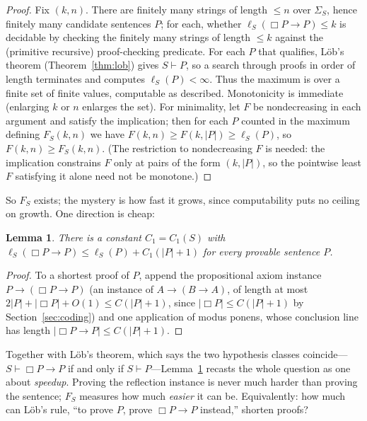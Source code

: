 \documentclass[11pt]{amsart}
\theoremstyle{plain}
\newtheorem{lemma}[theorem]{Lemma}
\theoremstyle{definition}
\begin{document}
\begin{proof}
Fix $(k,n)$. There are finitely many strings of length $\le n$ over $\Sigma_S$, hence finitely many candidate sentences $P$; for each, whether $\ell_S(\Box P \to P) \le k$ is decidable by checking the finitely many strings of length $\le k$ against the (primitive recursive) proof-checking predicate. For each $P$ that qualifies, L\"ob's theorem (Theorem~\ref{thm:lob}) gives $S \vdash P$, so a search through proofs in order of length terminates and computes $\ell_S(P) < \infty$. Thus the maximum is over a finite set of finite values, computable as described. Monotonicity is immediate (enlarging $k$ or $n$ enlarges the set). For minimality, let $F$ be nondecreasing in each argument and satisfy the implication; then for each $P$ counted in the maximum defining $F_S(k,n)$ we have $F(k,n) \ge F(k,|P|) \ge \ell_S(P)$, so $F(k,n) \ge F_S(k,n)$. (The restriction to nondecreasing $F$ is needed: the implication constrains $F$ only at pairs of the form $(k,|P|)$, so the pointwise least $F$ satisfying it alone need not be monotone.)
\end{proof}

So $F_S$ exists; the mystery is how fast it grows, since computability puts no ceiling on growth. One direction is cheap:

\begin{lemma}
\label{lem:cheap}
There is a constant $C_1 = C_1(S)$ with $\ell_S(\Box P \to P) \le \ell_S(P) + C_1(|P|+1)$ for every provable sentence $P$.
\end{lemma}

\begin{proof}
To a shortest proof of $P$, append the propositional axiom instance $P \to (\Box P \to P)$ (an instance of $A \to (B \to A)$, of length at most $2|P| + |\Box P| + O(1) \le C(|P|+1)$, since $|\Box P| \le C(|P|+1)$ by Section~\ref{sec:coding}) and one application of modus ponens, whose conclusion line has length $|\Box P \to P| \le C(|P|+1)$.
\end{proof}

Together with L\"ob's theorem, which says the two hypothesis classes coincide---$S \vdash \Box P \to P$ if and only if $S \vdash P$---Lemma~\ref{lem:cheap} recasts the whole question as one about \emph{speedup}. Proving the reflection instance is never much harder than proving the sentence; $F_S$ measures how much \emph{easier} it can be. Equivalently: how much can L\"ob's rule, ``to prove $P$, prove $\Box P \to P$ instead,'' shorten proofs?
\end{document}
